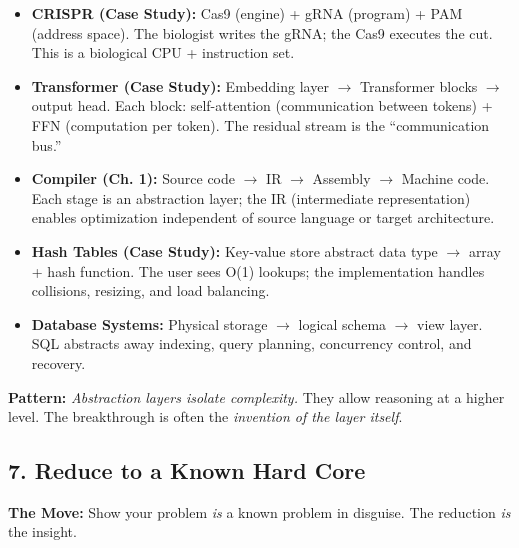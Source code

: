 \begin{itemize}
\item \textbf{CRISPR (Case Study):} Cas9 (engine) + gRNA (program) + PAM (address space). The biologist writes the gRNA; the Cas9 executes the cut. This is a biological CPU + instruction set.

\item \textbf{Transformer (Case Study):} Embedding layer $\to$ Transformer blocks $\to$ output head. Each block: self-attention (communication between tokens) + FFN (computation per token). The residual stream is the ``communication bus.''

\item \textbf{Compiler (Ch. 1):} Source code $\to$ IR $\to$ Assembly $\to$ Machine code. Each stage is an abstraction layer; the IR (intermediate representation) enables optimization independent of source language or target architecture.

\item \textbf{Hash Tables (Case Study):} Key-value store abstract data type $\to$ array + hash function. The user sees O(1) lookups; the implementation handles collisions, resizing, and load balancing.

\item \textbf{Database Systems:} Physical storage $\to$ logical schema $\to$ view layer. SQL abstracts away indexing, query planning, concurrency control, and recovery.
\end{itemize}

\textbf{Pattern:} \emph{Abstraction layers isolate complexity.} They allow reasoning at a higher level. The breakthrough is often the \emph{invention of the layer itself}.
\subsection{7. Reduce to a Known Hard Core}
\label{sec:anatomy:reduction}

\textbf{The Move:} Show your problem \emph{is} a known problem in disguise. The reduction \emph{is} the insight.

